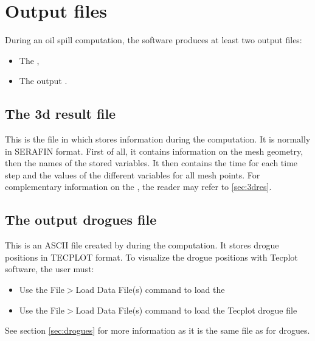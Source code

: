 \section{Output files}

During an oil spill computation, the  software produces at least two
output files:

\begin{itemize}
\item The ,

\item The output .
\end{itemize}


\subsection{The 3d result file}

This is the file in which  stores information during the computation.
It is normally in SERAFIN format. First of all, it contains information on the
mesh geometry, then the names of the stored variables. It then contains the
time for each time step and the values of the different variables for all mesh
points. For complementary information on the , the
reader may refer to \ref{sec:3dres}.


\subsection{The output drogues file}

This is an ASCII file created by  during the computation. It
stores drogue positions in TECPLOT format. To visualize the drogue positions
with Tecplot software, the user must:

\begin{itemize}
\item Use the File$>$Load Data File(s) command to load the 

\item Use the File$>$Load Data File(s) command to load the Tecplot drogue file
\end{itemize}

See section \ref{sec:drogues} for more information as it is the same file as for drogues.
